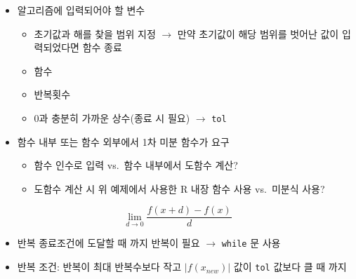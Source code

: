 \documentclass[
  11pt,
]{krantz}
\makeatletter
\providecommand{\tightlist}{%
  \setlength{\itemsep}{0pt}\setlength{\parskip}{0pt}}
\newenvironment{kframe}{%
\medskip{}
\setlength{\fboxsep}{.8em}
 \def\at@end@of@kframe{}%
 \ifinner\ifhmode%
  \def\at@end@of@kframe{\end{minipage}}%
  \begin{minipage}{\columnwidth}%
 \fi\fi%
 \def\FrameCommand##1{\hskip\@totalleftmargin \hskip-\fboxsep
 \colorbox{shadecolor}{##1}\hskip-\fboxsep
     \hskip-\linewidth \hskip-\@totalleftmargin \hskip\columnwidth}%
 \MakeFramed {\advance\hsize-\width
   \@totalleftmargin\z@ \linewidth\hsize
   \@setminipage}}%
 {\par\unskip\endMakeFramed%
 \at@end@of@kframe}
\newenvironment{rmdblock}[1]
  {
  \begin{itemize}
  \renewcommand{\labelitemi}{
    \raisebox{-.7\height}[0pt][0pt]{
      {\setkeys{Gin}{width=3em,keepaspectratio}\texttt{[image: images/\#1]}}
    }
  }
  \setlength{\fboxsep}{1em}
  \begin{kframe}
  \item
  }
  {
  \end{kframe}
  \end{itemize}
  }
\newenvironment{rmdnote}
  {\begin{rmdblock}{note}}
  {\end{rmdblock}}
\makeatother
\begin{document}
\begin{rmdnote}
\begin{itemize}
\tightlist
\item
  알고리즘에 입력되어야 할 변수

  \begin{itemize}
  \tightlist
  \item
    초기값과 해를 찾을 범위 지정 \(\rightarrow\) 만약 초기값이 해당 범위를 벗어난 값이 입력되었다면 함수 종료
  \item
    함수
  \item
    반복횟수
  \item
    0과 충분히 가까운 상수(종료 시 필요) \(\rightarrow\) \texttt{tol}
  \end{itemize}
\item
  함수 내부 또는 함수 외부에서 1차 미분 함수가 요구

  \begin{itemize}
  \tightlist
  \item
    함수 인수로 입력 vs.~함수 내부에서 도함수 계산?
  \item
    도함수 계산 시 위 예제에서 사용한 R 내장 함수 사용 vs.~미분식 사용?
  \end{itemize}
\end{itemize}

\[
\lim_{d \rightarrow 0} \frac{f(x + d) - f(x)}{d}
\]

\begin{itemize}
\tightlist
\item
  반복 종료조건에 도달할 때 까지 반복이 필요 \(\rightarrow\) \texttt{while} 문 사용
\item
  반복 조건: 반복이 최대 반복수보다 작고 \(|f(x_{new})|\) 값이 \texttt{tol} 값보다 클 때 까지
\end{itemize}
\end{rmdnote}

\normalsize

\footnotesize
\end{document}
